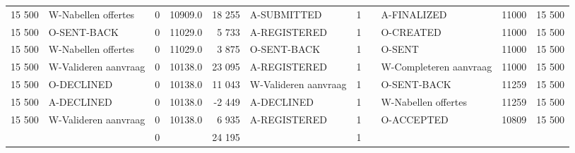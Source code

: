 \begin{tabular}{rlrlrlrllll}
15 500 & W-Nabellen offertes & 0 & 10909.0 & 18 255 & A-SUBMITTED & 1 &  & A-FINALIZED & 11000 & 15 500 \\
15 500 & O-SENT-BACK & 0 & 11029.0 & 5 733 & A-REGISTERED & 1 &  & O-CREATED & 11000 & 15 500 \\
15 500 & W-Nabellen offertes & 0 & 11029.0 & 3 875 & O-SENT-BACK & 1 &  & O-SENT & 11000 & 15 500 \\
15 500 & W-Valideren aanvraag & 0 & 10138.0 & 23 095 & A-REGISTERED & 1 &  & W-Completeren aanvraag & 11000 & 15 500 \\
15 500 & O-DECLINED & 0 & 10138.0 & 11 043 & W-Valideren aanvraag & 1 &  & O-SENT-BACK & 11259 & 15 500 \\
15 500 & A-DECLINED & 0 & 10138.0 & -2 449 & A-DECLINED & 1 &  & W-Nabellen offertes & 11259 & 15 500 \\
15 500 & W-Valideren aanvraag & 0 & 10138.0 & 6 935 & A-REGISTERED & 1 &  & O-ACCEPTED & 10809 & 15 500 \\
 &  & 0 &  & 24 195 &  & 1 &  &  &  &  \\
\bottomrule
\end{tabular}
